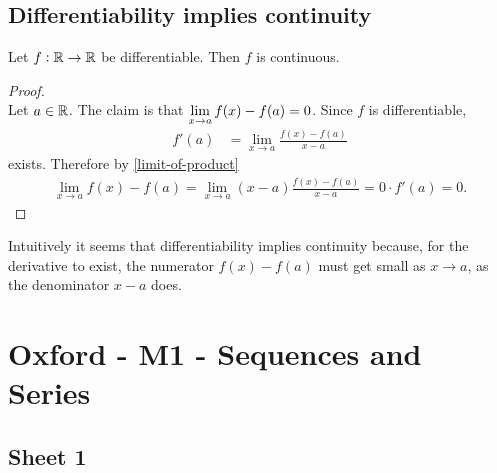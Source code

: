 \subsection{Differentiability implies continuity}
\begin{theorem*}
  Let $f:\mathbb{R}\to\mathbb{R}$ be differentiable. Then $f$ is continuous.
\end{theorem*}

\begin{proof}~\\
  Let $a \in \mathbb{R}$. The claim is that $\lim\limits_{x \to a} f(x) - f(a) = 0$. Since $f$ is differentiable,
  \begin{align*}
    f'(a) &= \lim_{x \to a} \frac{f(x) - f(a)}{x - a}
  \end{align*}
  exists. Therefore by \eqref{limit-of-product}
  \begin{align*}
    \lim_{x \to a} f(x) - f(a) = \lim_{x \to a} (x - a)\frac{f(x) - f(a)}{x - a} = 0\cdot f'(a) = 0.
  \end{align*}
\end{proof}

\begin{remark*}
  Intuitively it seems that differentiability implies continuity because, for the derivative to
  exist, the numerator $f(x) - f(a)$ must get small as $x\to a$, as the denominator $x - a$ does.
\end{remark*}


\newpage
\section{Oxford - M1 - Sequences and Series}

\subsection{Sheet 1}

